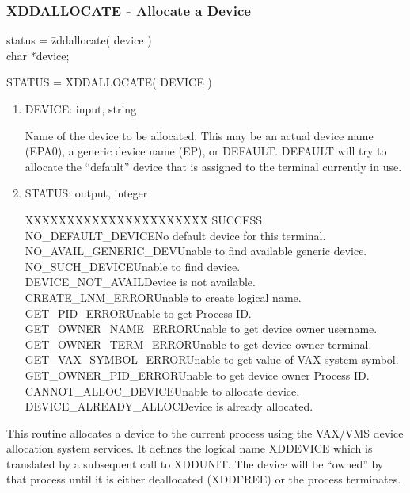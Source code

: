 \subsubsection{XDDALLOCATE - Allocate a Device}
\begin{tabbing}
status = \=zddallocate( device )\\
\>char  *device;\\
\end{tabbing}
STATUS = XDDALLOCATE( DEVICE )
\begin{enumerate}
\item DEVICE:  input, string

Name of the device to be allocated.  This may be an actual device
name (EPA0), a generic device name (EP), or DEFAULT.  
DEFAULT will try to allocate the ``default''
device that is assigned to the terminal currently in use.
\item STATUS:  output, integer
\begin{tabbing}
XXXXXXXXXXXXXXXXXXXXXX\=\kill
SUCCESS\\
NO\_DEFAULT\_DEVICE\>No default device for this terminal.\\
NO\_AVAIL\_GENERIC\_DEV\>Unable to find available generic device.\\
NO\_SUCH\_DEVICE\>Unable to find device.\\
DEVICE\_NOT\_AVAIL\>Device is not available.\\
CREATE\_LNM\_ERROR\>Unable to create logical name.\\
GET\_PID\_ERROR\>Unable to get Process ID.\\
GET\_OWNER\_NAME\_ERROR\>Unable to get device owner username.\\
GET\_OWNER\_TERM\_ERROR\>Unable to get device owner terminal.\\
GET\_VAX\_SYMBOL\_ERROR\>Unable to get value of VAX system symbol.\\
GET\_OWNER\_PID\_ERROR\>Unable to get device owner Process ID.\\
CANNOT\_ALLOC\_DEVICE\>Unable to allocate device.\\
DEVICE\_ALREADY\_ALLOC\>Device is already allocated.\\
\end{tabbing}
\end{enumerate}
This routine allocates a device to the current
process using the VAX/VMS device allocation system services. It defines
the logical name XDDEVICE which is translated by a subsequent call to XDDUNIT.
The device will be ``owned'' by that process until it is either deallocated
(XDDFREE) or the process terminates.

